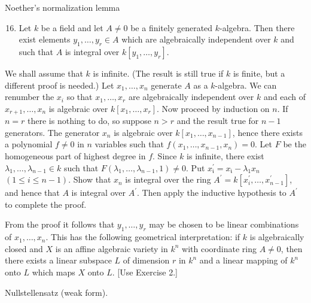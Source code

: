 \documentclass{standalone}
\theoremstyle{definition}
\theoremstyle{remark}
\begin{document}
Noether's normalization lemma

\begin{enumerate}
  \setcounter{enumi}{15}
  \item Let $k$ be a field and let $A \neq 0$ be a finitely generated $k$-algebra. Then there exist elements $y_{1}, \ldots, y_{r} \in A$ which are algebraically independent over $k$ and such that $A$ is integral over $k\left[y_{1}, \ldots, y_{r}\right]$.
\end{enumerate}

We shall assume that $k$ is infinite. (The result is still true if $k$ is finite, but a different proof is needed.) Let $x_{1}, \ldots, x_{n}$ generate $A$ as a $k$-algebra. We can renumber the $x_{i}$ so that $x_{1}, \ldots, x_{r}$ are algebraically independent over $k$ and each of $x_{r+1}, \ldots, x_{n}$ is algebraic over $k\left[x_{1}, \ldots, x_{r}\right]$. Now proceed by induction on $n$. If $n=r$ there is nothing to do, so suppose $n>r$ and the result true for $n-1$ generators. The generator $x_{n}$ is algebraic over $k\left[x_{1}, \ldots, x_{n-1}\right]$, hence there exists a polynomial $f \neq 0$ in $n$ variables such that $f\left(x_{1}, \ldots, x_{n-1}, x_{n}\right)=0$. Let $F$ be the homogeneous part of highest degree in $f$. Since $k$ is infinite, there exist $\lambda_{1}, \ldots, \lambda_{n-1} \in k$ such that $F\left(\lambda_{1}, \ldots, \lambda_{n-1}, 1\right) \neq 0$. Put $x_{\mathfrak{i}}^{\prime}=x_{\mathfrak{i}}-\lambda_{1} x_{n}$ $(1 \leqslant i \leqslant n-1)$. Show that $x_{n}$ is integral over the ring $A^{\prime}=k\left[x_{i}^{\prime}, \ldots, x_{n-1}^{\prime}\right]$, and hence that $A$ is integral over $A^{\prime}$. Then apply the inductive hypothesis to $A^{\prime}$ to complete the proof.

From the proof it follows that $y_{1}, \ldots, y_{r}$ may be chosen to be linear combinations of $x_{1}, \ldots, x_{n}$. This has the following geometrical interpretation: if $k$ is algebraically closed and $X$ is an affine algebraic variety in $k^{n}$ with coordinate ring $A \neq 0$, then there exists a linear subspace $L$ of dimension $r$ in $k^{n}$ and a linear mapping of $k^{n}$ onto $L$ which maps $X$ onto $L$. [Use Exercise 2.]

Nullstellensatz (weak form).
\end{document}

